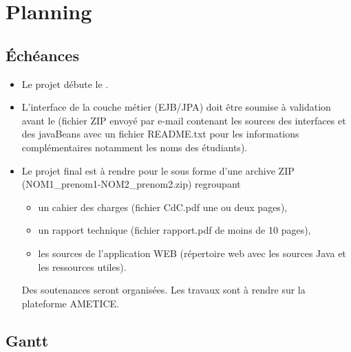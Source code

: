\section{\textbf{Planning}}

\subsection{\textbf{Échéances}}

\begin{itemize}[label=\textcolor{rougeBordeaux}{$\bullet$}] 
	\item Le projet débute le . 
	\item L'interface de la couche métier (EJB/JPA) doit être soumise à validation avant le  (fichier ZIP envoyé par e-mail contenant les sources des interfaces et des javaBeans avec un fichier README.txt pour les informations complémentaires notamment les noms des étudiants).
	\item Le projet final est à rendre pour le  sous forme d'une archive ZIP (NOM1\_prenom1-NOM2\_prenom2.zip) regroupant
	\begin{itemize}[label=\textcolor{rougeBordeaux}{$\bullet$}]
		\item un cahier des charges (fichier CdC.pdf une ou deux pages),
		\item un rapport technique (fichier rapport.pdf de moins de 10 pages),
		\item les sources de l'application WEB (répertoire web avec les sources Java et les ressources utiles).
	\end{itemize}
			Des soutenances seront organisées. Les travaux sont à rendre sur la plateforme AMETICE.
\end{itemize}

\subsection{\textbf{Gantt}}